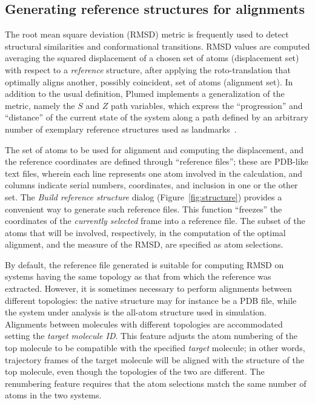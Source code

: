 \documentclass[preprint,12pt]{elsarticle}
\begin{document}
\subsection{Generating reference structures for alignments}


The root mean square deviation (RMSD) metric is frequently used to
detect structural similarities and conformational transitions.  RMSD
values are computed averaging the squared displacement of a chosen set
of atoms (displacement set) with respect to a \emph{reference}
structure,  after applying the roto-translation that optimally
aligns another, possibly coincident, set of atoms (alignment set).  In
addition to the usual definition, Plumed implements a generalization
of the metric, namely the $S$ and $Z$ path variables, which express
the ``progression'' and ``distance'' of the current state of the
system along a path defined by an arbitrary number of exemplary
reference structures used as
landmarks~\cite{Branduardi_Gervasio_Parrinello_2007}.



The set of atoms to be used for alignment and computing the
displacement, and the reference coordinates are defined through
``reference files''; these are PDB-like text files, wherein each line
represents one atom involved in the calculation, and columns indicate
serial numbers, coordinates, and inclusion in one or the other set.
The \emph{Build reference structure} dialog
(Figure~\ref{fig:structure}) provides a convenient way to generate
such reference files.  This function ``freezes'' the coordinates of the
\emph{currently selected} frame into a reference file. The subset of
the atoms that will be involved, respectively, in the computation of
the optimal alignment, and the measure of the RMSD, are specified as
atom selections.


By default, the reference file generated is suitable for computing
RMSD on systems having the same topology as that from which the
reference was extracted.  However, it is sometimes necessary to
perform alignments between different topologies: the native structure
may for instance be a PDB file, while the system under analysis is the
all-atom structure used in simulation. Alignments between molecules
with different topologies are accommodated setting the \emph{target
  molecule ID}. This feature adjusts the atom numbering of the top
molecule to be compatible with the specified \emph{target} molecule;
in other words, trajectory frames of the target molecule will be
aligned with the structure of the top molecule, even though the
topologies of the two are different. The renumbering feature requires
that the atom selections match the same number of atoms in the two
systems.
\end{document}

